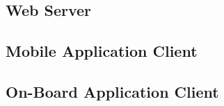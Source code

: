 \subsection{Web Server} %

\subsection{Mobile Application Client}

\subsection{On-Board Application Client}


